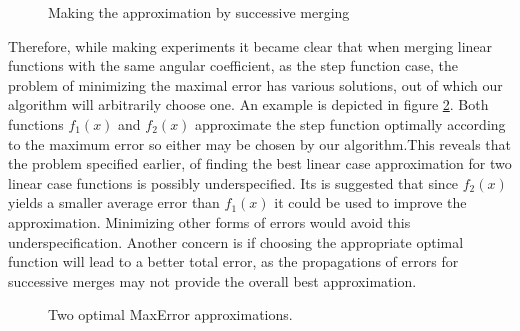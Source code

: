 \begin{figure}[!h]
\centering
\begin{minipage}{.7\textwidth}
  \centering
\end{minipage}
\begin{minipage}{.7\textwidth}
\centering
{}
\end{minipage}
\begin{minipage}{.7\textwidth}
\centering
{}
\end{minipage}
\caption{ Making the approximation by successive merging}
 \label{steplining}
\end{figure}

Therefore, while making experiments it became clear that when merging linear functions with the same angular coefficient, as the step function case, the problem of minimizing the maximal error has various solutions, out of which our algorithm will arbitrarily choose one. An example is depicted in figure \ref{steplin2}. Both functions $f_1(x)$ and $f_2(x)$ approximate the step function optimally according to the maximum error so either may be chosen by our algorithm.This reveals that the problem specified earlier, of finding the best linear case approximation for two linear case functions is possibly underspecified.  Its is suggested that since $f_2(x)$ yields a smaller average error than $f_1(x)$ it could be used to improve the approximation. Minimizing other forms of errors would avoid this underspecification. Another concern is if choosing the appropriate optimal function will lead to a better total error, as the propagations of errors for successive merges may not provide the overall best approximation.
\begin{figure}[h]
\center
{}%
\caption{Two optimal MaxError approximations.}
\label{steplin2} 
\end{figure}

